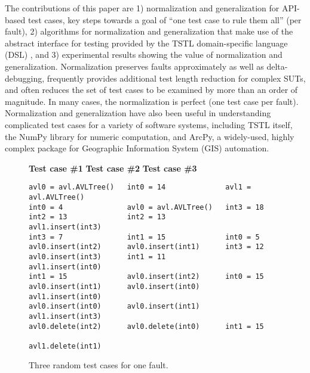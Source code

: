 The contributions of this paper are 1) normalization and
generalization for API-based test cases, key steps towards a goal of
``one test case to rule them all'' (per fault), 2) algorithms for
normalization and generalization that make use of the abstract
interface for testing provided by the TSTL \cite{tstl,NFM15,ISSTA15}
domain-specific language (DSL) \cite{Fow10}, and 3)
experimental results showing the value of normalization and
generalization.  Normalization preserves faults approximately
as well as delta-debugging, frequently provides additional test length
reduction for complex SUTs, and often reduces
the set of test cases to be examined by more than an order of
magnitude. In many cases, the normalization is perfect (one test case
per fault).  Normalization and generalization have also been useful in
understanding complicated test cases for a variety of software
systems, including TSTL itself, the NumPy library for numeric
computation, and ArcPy, a widely-used, highly complex package for
Geographic Information System (GIS) automation.

\begin{figure}[t]
{\scriptsize
{\bf Test case \#1}\hspace{0.415in} {\bf Test case \#2} \hspace{0.41in}
{\bf Test case \#3}
\begin{verbatim}
avl0 = avl.AVLTree()   int0 = 14              avl1 = avl.AVLTree()
int0 = 4               avl0 = avl.AVLTree()   int3 = 18 
int2 = 13              int2 = 13              avl1.insert(int3) 
int3 = 7               int1 = 15              int0 = 5 
avl0.insert(int2)      avl0.insert(int1)      int3 = 12 
avl0.insert(int3)      int1 = 11              avl1.insert(int0) 
int1 = 15              avl0.insert(int2)      int0 = 15 
avl0.insert(int1)      avl0.insert(int0)      avl1.insert(int0) 
avl0.insert(int0)      avl0.insert(int1)      avl1.insert(int3) 
avl0.delete(int2)      avl0.delete(int0)      int1 = 15 
                                              avl1.delete(int1) 
\end{verbatim}
}
\caption {\scriptsize{Three random test cases for one fault.}}
\label{threetests}
\end{figure}

